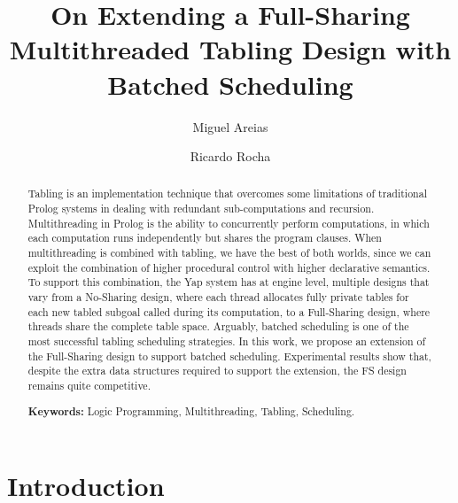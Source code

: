 \documentclass{llncs}
\begin{document}
\title{On Extending a Full-Sharing Multithreaded Tabling Design with
  Batched Scheduling}

\author{Miguel Areias \and Ricardo Rocha}


\maketitle


\begin{abstract}
Tabling is an implementation technique that overcomes some limitations
of traditional Prolog systems in dealing with redundant
sub-computations and recursion. Multithreading in Prolog is the
ability to concurrently perform computations, in which each
computation runs independently but shares the program clauses. When
multithreading is combined with tabling, we have the best of both
worlds, since we can exploit the combination of higher procedural
control with higher declarative semantics.  To support this
combination, the Yap system has at engine level, multiple designs that
vary from a No-Sharing design, where each thread allocates fully
private tables for each new tabled subgoal called during its
computation, to a Full-Sharing design, where threads share the
complete table space. Arguably, batched scheduling is one of the most
successful tabling scheduling strategies. In this work, we propose an
extension of the Full-Sharing design to support batched
scheduling. Experimental results show that, despite the extra data
structures required to support the extension, the FS design remains
quite competitive.

\textbf{Keywords:} Logic Programming, Multithreading, Tabling, Scheduling.
\end{abstract}


\section{Introduction}
\end{document}
